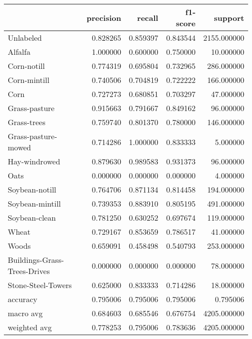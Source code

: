 \begin{tabular}{lrrrr}
\toprule
{} &  precision &    recall &  f1-score &      support \\
\midrule
Unlabeled                    &   0.828265 &  0.859397 &  0.843544 &  2155.000000 \\
Alfalfa                      &   1.000000 &  0.600000 &  0.750000 &    10.000000 \\
Corn-notill                  &   0.774319 &  0.695804 &  0.732965 &   286.000000 \\
Corn-mintill                 &   0.740506 &  0.704819 &  0.722222 &   166.000000 \\
Corn                         &   0.727273 &  0.680851 &  0.703297 &    47.000000 \\
Grass-pasture                &   0.915663 &  0.791667 &  0.849162 &    96.000000 \\
Grass-trees                  &   0.759740 &  0.801370 &  0.780000 &   146.000000 \\
Grass-pasture-mowed          &   0.714286 &  1.000000 &  0.833333 &     5.000000 \\
Hay-windrowed                &   0.879630 &  0.989583 &  0.931373 &    96.000000 \\
Oats                         &   0.000000 &  0.000000 &  0.000000 &     4.000000 \\
Soybean-notill               &   0.764706 &  0.871134 &  0.814458 &   194.000000 \\
Soybean-mintill              &   0.739353 &  0.883910 &  0.805195 &   491.000000 \\
Soybean-clean                &   0.781250 &  0.630252 &  0.697674 &   119.000000 \\
Wheat                        &   0.729167 &  0.853659 &  0.786517 &    41.000000 \\
Woods                        &   0.659091 &  0.458498 &  0.540793 &   253.000000 \\
Buildings-Grass-Trees-Drives &   0.000000 &  0.000000 &  0.000000 &    78.000000 \\
Stone-Steel-Towers           &   0.625000 &  0.833333 &  0.714286 &    18.000000 \\
accuracy                     &   0.795006 &  0.795006 &  0.795006 &     0.795006 \\
macro avg                    &   0.684603 &  0.685546 &  0.676754 &  4205.000000 \\
weighted avg                 &   0.778253 &  0.795006 &  0.783636 &  4205.000000 \\
\bottomrule
\end{tabular}
